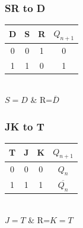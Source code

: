 \documentclass[11pt]{article}
\begin{document}
\begin{multicols}{2}
\subsubsection*{SR to D}
    \begin{minipage}{\linewidth}
        \begin{center}
            \begin{tabular}{ |c|c|c|c| } 
                \hline
                D & S & R & $Q_{n+1}$ \\
                \hline
                0 & 0 & 1 & 0\\
                \hline
                1 & 1 & 0 & 1 \\
                \hline
            \end{tabular}\\
            \vspace{10pt}
            $S=D$ \& R=$\overline{D}$
        \end{center}
    \end{minipage}
\subsubsection*{JK to T}
    \begin{minipage}{\linewidth}
        \begin{center}
            \begin{tabular}{ |c|c|c|c| } 
                \hline
                T & J & K & $Q_{n+1}$ \\
                \hline
                0 & 0 & 0 & $Q_n$\\
                \hline
                1 & 1 & 1 & $\overline{Q_n}$ \\
                \hline
            \end{tabular}\\
            \vspace{10pt}
            $J=T$ \& R=$K=T$
        \end{center}
    \end{minipage}

\end{multicols}
\end{document}
